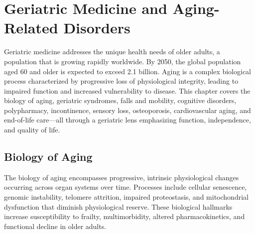\chapter{Geriatric Medicine and Aging-Related Disorders}
\label{ch:geriatric}
Geriatric medicine addresses the unique health needs of older adults, a population that is growing rapidly worldwide. By 2050, the global population aged 60 and older is expected to exceed 2.1 billion. Aging is a complex biological process characterized by progressive loss of physiological integrity, leading to impaired function and increased vulnerability to disease. This chapter covers the biology of aging, geriatric syndromes, falls and mobility, cognitive disorders, polypharmacy, incontinence, sensory loss, osteoporosis, cardiovascular aging, and end-of-life care---all through a geriatric lens emphasizing function, independence, and quality of life.

\section{Biology of Aging}




The biology of aging encompasses progressive, intrinsic physiological changes occurring across organ systems over time. Processes include cellular senescence, genomic instability, telomere attrition, impaired proteostasis, and mitochondrial dysfunction that diminish physiological reserve. These biological hallmarks increase susceptibility to frailty, multimorbidity, altered pharmacokinetics, and functional decline in older adults.





\label{sec:Biology of Aging}

